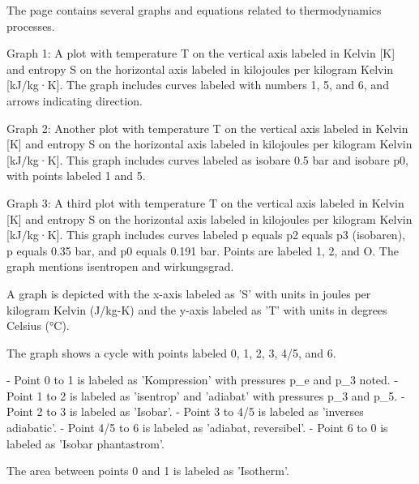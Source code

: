 The page contains several graphs and equations related to thermodynamics processes. 

Graph 1: A plot with temperature T on the vertical axis labeled in Kelvin [K] and entropy S on the horizontal axis labeled in kilojoules per kilogram Kelvin [kJ/kg·K]. The graph includes curves labeled with numbers 1, 5, and 6, and arrows indicating direction.

Graph 2: Another plot with temperature T on the vertical axis labeled in Kelvin [K] and entropy S on the horizontal axis labeled in kilojoules per kilogram Kelvin [kJ/kg·K]. This graph includes curves labeled as isobare 0.5 bar and isobare p0, with points labeled 1 and 5.

Graph 3: A third plot with temperature T on the vertical axis labeled in Kelvin [K] and entropy S on the horizontal axis labeled in kilojoules per kilogram Kelvin [kJ/kg·K]. This graph includes curves labeled p equals p2 equals p3 (isobaren), p equals 0.35 bar, and p0 equals 0.191 bar. Points are labeled 1, 2, and O. The graph mentions isentropen and wirkungsgrad.

A graph is depicted with the x-axis labeled as 'S' with units in joules per kilogram Kelvin (J/kg-K) and the y-axis labeled as 'T' with units in degrees Celsius (°C). 

The graph shows a cycle with points labeled 0, 1, 2, 3, 4/5, and 6. 

- Point 0 to 1 is labeled as 'Kompression' with pressures p_e and p_3 noted.
- Point 1 to 2 is labeled as 'isentrop' and 'adiabat' with pressures p_3 and p_5.
- Point 2 to 3 is labeled as 'Isobar'.
- Point 3 to 4/5 is labeled as 'inverses adiabatic'.
- Point 4/5 to 6 is labeled as 'adiabat, reversibel'.
- Point 6 to 0 is labeled as 'Isobar phantastrom'.

The area between points 0 and 1 is labeled as 'Isotherm'.